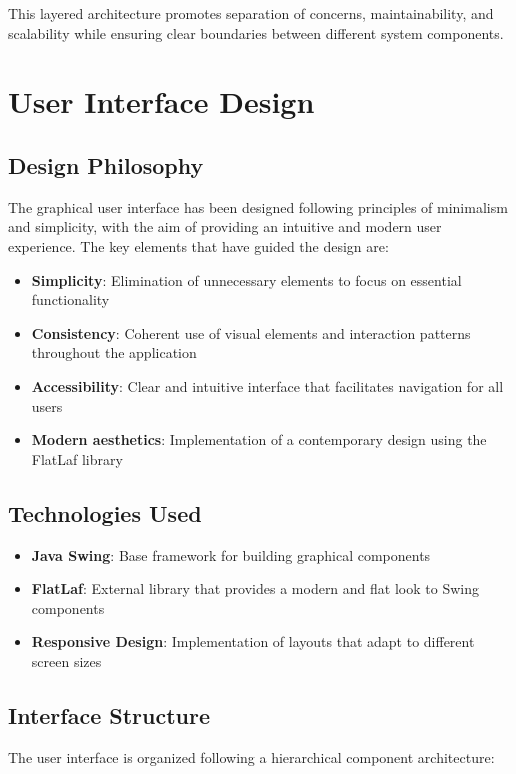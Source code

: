 \documentclass[conference]{IEEEtran}
\begin{document}
    This layered architecture promotes separation of concerns, maintainability, and scalability while ensuring clear boundaries between different system components.

    \section{User Interface Design}

    \subsection{Design Philosophy}
    The graphical user interface has been designed following principles of minimalism and simplicity, with the aim of providing an intuitive and modern user experience. The key elements that have guided the design are:

    \begin{itemize}
        \item \textbf{Simplicity}: Elimination of unnecessary elements to focus on essential functionality
        \item \textbf{Consistency}: Coherent use of visual elements and interaction patterns throughout the application
        \item \textbf{Accessibility}: Clear and intuitive interface that facilitates navigation for all users
        \item \textbf{Modern aesthetics}: Implementation of a contemporary design using the FlatLaf library
    \end{itemize}

    \subsection{Technologies Used}

    \begin{itemize}
        \item \textbf{Java Swing}: Base framework for building graphical components
        \item \textbf{FlatLaf}: External library that provides a modern and flat look to Swing components
        \item \textbf{Responsive Design}: Implementation of layouts that adapt to different screen sizes
    \end{itemize}

    \subsection{Interface Structure}
    The user interface is organized following a hierarchical component architecture:
\end{document}
